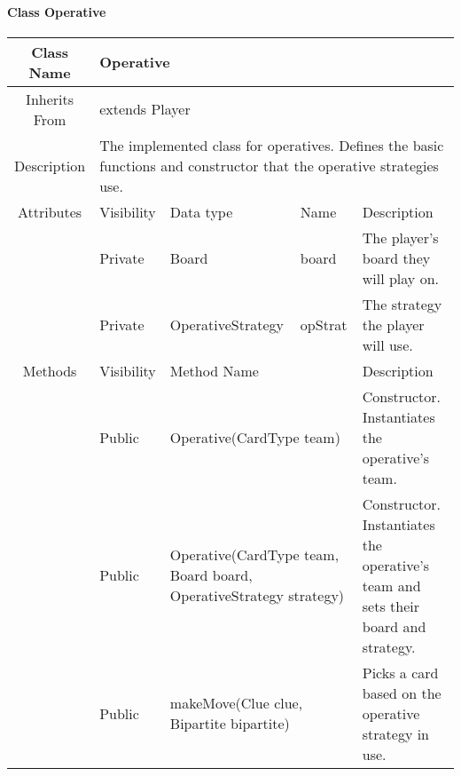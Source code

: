 \paragraph{Class Operative}\mbox{}
\begin{tabularx}{\textwidth}{|c||l|l|l|X|}
    \hline
    \cellcolor{lightgray}Class Name & \multicolumn{4}{l|}{Operative}\\
    \hline
    \cellcolor{lightgray}Inherits From & \multicolumn{4}{p{12cm}|}{extends Player}\\
    \hline
    \cellcolor{lightgray}Description & \multicolumn{4}{p{12cm}|}{The implemented class for operatives. Defines the basic functions and constructor that the operative strategies use.}\\
    \hline\hline
    
    \cellcolor{lightgray}Attributes & \cellcolor{lightgray}Visibility & \cellcolor{lightgray}Data type & \cellcolor{lightgray}Name & \cellcolor{lightgray}Description\\\cline{2-5}
    \cellcolor{lightgray} & Private & Board & board & The player's board they will play on.\\\cline{2-5}
    \cellcolor{lightgray} & Private & OperativeStrategy & opStrat & The strategy the player will use.\\
    \hline\hline
    
    \cellcolor{lightgray}Methods & \cellcolor{lightgray}Visibility & \multicolumn{2}{l|}{\cellcolor{lightgray}Method Name} & \cellcolor{lightgray}Description\\\cline{2-5}
    \hline
    \cellcolor{lightgray} & Public & \multicolumn{2}{X|}{Operative(CardType team)} & Constructor. Instantiates the operative's team.\\
    \hline
    \cellcolor{lightgray} & Public & \multicolumn{2}{X|}{Operative(CardType team, Board board, OperativeStrategy strategy)} & Constructor. Instantiates the operative's team and sets their board and strategy.\\
    \hline
    \cellcolor{lightgray} & Public & \multicolumn{2}{X|}{makeMove(Clue clue, Bipartite bipartite)} & Picks a card based on the operative strategy in use.\\
    \hline
\end{tabularx}